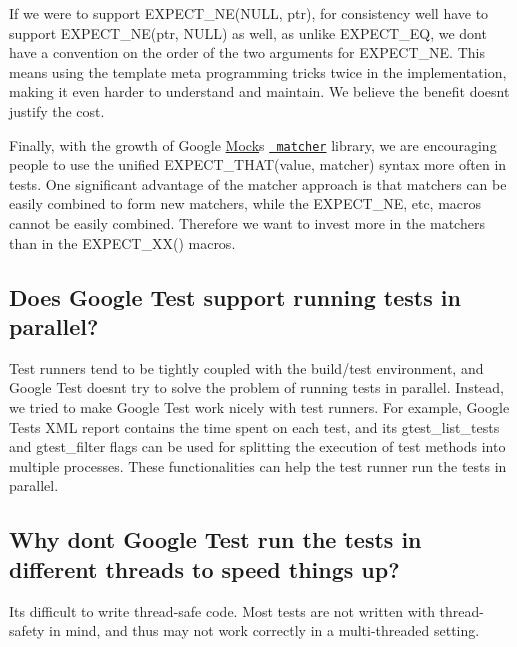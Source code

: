 If we were to support {\ttfamily E\+X\+P\+E\+C\+T\+\_\+\+N\+E(\+N\+U\+L\+L, ptr)}, for consistency we\textquotesingle{}ll have to support {\ttfamily E\+X\+P\+E\+C\+T\+\_\+\+N\+E(ptr, N\+U\+L\+L)} as well, as unlike {\ttfamily E\+X\+P\+E\+C\+T\+\_\+\+EQ}, we don\textquotesingle{}t have a convention on the order of the two arguments for {\ttfamily E\+X\+P\+E\+C\+T\+\_\+\+NE}. This means using the template meta programming tricks twice in the implementation, making it even harder to understand and maintain. We believe the benefit doesn\textquotesingle{}t justify the cost.

Finally, with the growth of Google \mbox{\hyperlink{class_mock}{Mock}}\textquotesingle{}s \href{../../CookBook.md#using-matchers-in-google-test-assertions}\texttt{ matcher} library, we are encouraging people to use the unified {\ttfamily E\+X\+P\+E\+C\+T\+\_\+\+T\+H\+A\+T(value, matcher)} syntax more often in tests. One significant advantage of the matcher approach is that matchers can be easily combined to form new matchers, while the {\ttfamily E\+X\+P\+E\+C\+T\+\_\+\+NE}, etc, macros cannot be easily combined. Therefore we want to invest more in the matchers than in the {\ttfamily E\+X\+P\+E\+C\+T\+\_\+\+X\+X()} macros.

\subsection*{Does Google Test support running tests in parallel?}

Test runners tend to be tightly coupled with the build/test environment, and Google Test doesn\textquotesingle{}t try to solve the problem of running tests in parallel. Instead, we tried to make Google Test work nicely with test runners. For example, Google Test\textquotesingle{}s X\+ML report contains the time spent on each test, and its {\ttfamily gtest\+\_\+list\+\_\+tests} and {\ttfamily gtest\+\_\+filter} flags can be used for splitting the execution of test methods into multiple processes. These functionalities can help the test runner run the tests in parallel.

\subsection*{Why don\textquotesingle{}t Google Test run the tests in different threads to speed things up?}

It\textquotesingle{}s difficult to write thread-\/safe code. Most tests are not written with thread-\/safety in mind, and thus may not work correctly in a multi-\/threaded setting.

